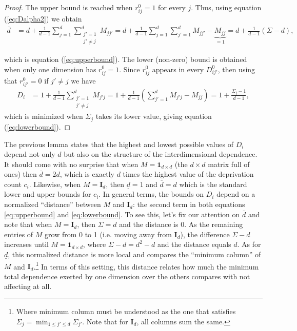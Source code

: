 \documentclass[english, a4paper,12pt]{article}
\begin{document}
\begin{proof} The upper bound is reached when $r_{ij}^{0} = 1$ for every $j$. Thus, using equation (\ref{eq:Dalpha2}) we obtain 
	\begin{align*}
		\overline{d}
			&=	d + \frac{1}{d-1}\sum_{j=1}^{d} \sum_{\substack{j' = 1 \\ j' \neq j}}^{d} M_{jj'}
			=	d + \frac{1}{d-1}\sum_{j=1}^{d} \sum_{j' = 1}^{d} M_{jj'} - \underbrace{M_{jj}}_{= 1}
			=	d + \frac{1}{d-1} \left(\Sigma - d \right),
	\end{align*}

which is equation (\ref{eq:upperbound}). The lower (non-zero) bound is obtained when only one dimension has $r_{ij}^{0} = 1$. Since $r_{ij}^{0}$ appears in every $D_{ij'}^{0}$, then using that $r_{ij'}^{0} = 0$ if $j' \neq j$ we have
	\begin{align*}
		D_{i}	&=	1 + \frac{1}{d-1} \sum_{\substack{j' =1 \\ j' \neq j}}^{d} M_{j'j}
			=	1 + \frac{1}{d-1} \left(\sum_{j'=1}^{d} M_{j'j} - M_{jj} \right)
			=	1 + \frac{\Sigma_{j} - 1}{d-1},
	\end{align*}
which is minimized when $\Sigma_{j}$ takes its lower value, giving equation (\ref{eq:lowerbound}).
\end{proof}

The previous lemma states that the highest and lowest possible values of $D_{i}$ depend not only $d$ but also on the structure of the interdimensional dependence. It should come with no surprise that when $M = \mathbf{1}_{d \times d}$ (the $d \times d$ matrix full of ones) then $\overline{d} = 2d$, which is exactly $d$ times the highest value of the deprivation count $c_{i}$. Likewise, when $M = \mathbf{I}_{d}$, then $\underline{d} = 1$ and $\overline{d} = d$ which is the standard lower and upper bounds for $c_{i}$. In general terms, the bounds on $D_{i}$ depend on a normalized ``distance'' between $M$ and $\mathbf{I}_{d}$: the second term in both equations \eqref{eq:upperbound} and \eqref{eq:lowerbound}. To see this, let's fix our attention on $\overline{d}$ and note that when $M = \mathbf{I}_{d}$, then $\Sigma = d$ and the distance is 0. As the remaining entries of $M$ grow from 0 to 1 (i.e. moving away from $\mathbf{I}_{d}$), the difference $\Sigma - d$ increases until $M = \mathbf{1}_{d\times d}$, where $\Sigma - d = d^{2} - d$ and the distance equals $d$. As for $\underline{d}$, this normalized distance is more local and compares the ``minimum column'' of $M$ and $\mathbf{I}_{d}$.\footnote{Where minimum column must be understood as the one that satisfies $\Sigma_{j} = \min_{1 \leq j' \leq d} \Sigma_{j'}$. Note that for $\mathbf{I}_{d}$, all columns sum the same.} In terms of this setting, this distance relates how much the minimum total dependence exerted by one dimension over the others compares with not affecting at all. 
\end{document}
